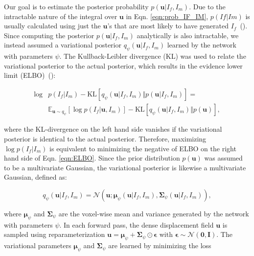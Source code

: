 \documentclass[times,twocolumn,final]{elsarticle}
\begin{document}
Our goal is to estimate the posterior probability $p(\mathbf{u}|I_f, I_m)$. Due to the intractable nature of the integral over $\mathbf{u}$ in Eqn. \ref{eqn:prob_IF_IM}, $p(I f|I m)$ is usually calculated using just the $\mathbf{u}$'s that are most likely to have generated $I_f$~(\cite{krebs2019learning}). Since computing the posterior $p(\mathbf{u}|I_f, I_m)$ analytically is also intractable, we instead assumed a variational posterior $q_\psi(\mathbf{u}|I_f, I_m)$ learned by the network with parameters $\psi$. The Kullback-Leibler divergence (KL) was used to relate the variational posterior to the actual posterior, which results in the evidence lower limit (ELBO)~(\cite{kingma2013auto}):
\begin{linenomath}
\begin{equation}
\label{eqn:ELBO}
    \begin{split}
        \log &p(I_f|I_m)-\text{KL}\left[q_\psi(\mathbf{u}|I_f, I_m)\Vert p(\mathbf{u}|I_f, I_m)\right]=\\
        &\mathbb{E}_{\mathbf{u}\sim q_{\psi}}\left[\log p(I_f|\mathbf{u}, I_m)\right]-\text{KL}\left[q_\psi(\mathbf{u}|I_f, I_m)\Vert p(\mathbf{u})\right],
    \end{split}
\end{equation}
\end{linenomath}
where the KL-divergence on the left hand side vanishes if the variational posterior is identical to the actual posterior. Therefore, maximizing $\log p(I_f|I_m)$ is equivalent to minimizing the negative of ELBO on the right hand side of Eqn. \ref{eqn:ELBO}. Since the prior distribution $p(\mathbf{u})$ was assumed to be a multivariate Gaussian, the variational posterior is likewise a multivariate Gaussian, defined as:
\begin{linenomath}
\begin{equation}
    q_\psi(\mathbf{u}|I_f, I_m)=\mathcal{N}(\mathbf{u}; \mathbf{\mu}_\psi(\mathbf{u}|I_f, I_m), \mathbf{\Sigma}_\psi(\mathbf{u}|I_f, I_m)),
\end{equation}
\end{linenomath}
where $\mathbf{\mu}_\psi$ and $\mathbf{\Sigma}_\psi$ are the voxel-wise mean and variance generated by the network with parameters $\psi$. In each forward pass, the dense displacement field $\mathbf{u}$ is sampled using reparameterization $\mathbf{u}=\mathbf{\mu}_\psi+\mathbf{\Sigma}_\psi\odot\mathbf{\epsilon}$ with $\mathbf{\epsilon}\sim\mathcal{N}(\mathbf{0}, \mathbf{I})$. The variational parameters $\mathbf{\mu}_\psi$ and $\mathbf{\Sigma}_\psi$ are learned by minimizing the loss
\end{document}
